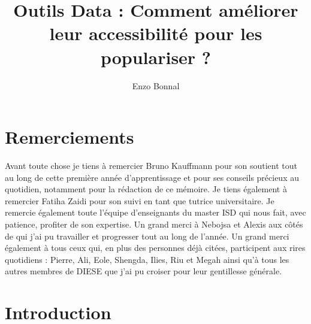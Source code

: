 \documentclass[12pt]{report}
\title{Outils Data : Comment améliorer leur accessibilité pour les populariser ?}
\author{Enzo Bonnal}
\date{\parbox{\linewidth}{\centering%
		\the\year\endgraf\bigskip
		{Maître d'apprentissage : Bruno Kauffmann\endgraf Tutrice enseignante : Fatiha Zaïdi\endgraf\medskip
			Mémoire de première année de Master d'Informatique pour la Science des Données\endgraf\medskip
			Université Paris Saclay\endgraf\medskip
			Entreprise d'Accueil : Orange}}}
\begin{document}
	
	\maketitle
	\newpage
	
	
	\newpage
	\chapter*{Remerciements}
	Avant toute chose je tiens à remercier Bruno Kauffmann pour son soutient tout au long de cette première année d'apprentissage et pour ses conseils précieux au quotidien, notamment pour la rédaction de ce mémoire. \newline
	Je tiens également à remercier Fatiha Zaidi pour son suivi en tant que tutrice universitaire. Je remercie également toute l'équipe d'enseignants du master ISD qui nous fait, avec patience, profiter de son expertise.\newline
	Un grand merci à Nebojsa et Alexis aux côtés de qui j'ai pu travailler et progresser tout au long de l'année. Un grand merci également à tous ceux qui, en plus des personnes déjà citées, participent aux rires quotidiens : Pierre, Ali, Eole, Shengda, Ilies, Riu et Megah ainsi qu'à tous les autres membres de DIESE que j'ai pu croiser pour leur gentillesse générale.
	\newpage
	\chapter*{Introduction}
\end{document}
